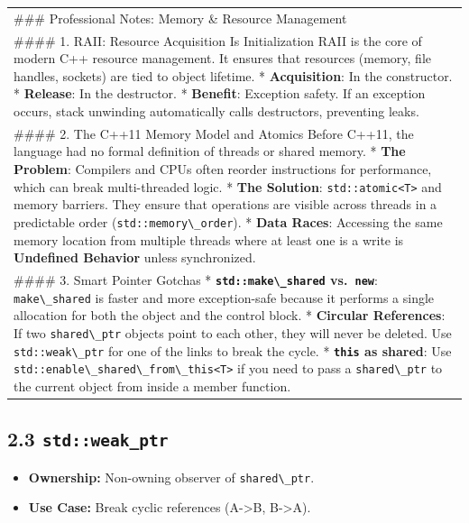 \begin{longtable}[]{@{}
  >{\raggedright\arraybackslash}p{}@{}}
\toprule
\endhead
\#\#\# Professional Notes: Memory \& Resource Management \\
\#\#\#\# 1. RAII: Resource Acquisition Is Initialization RAII is the
core of modern C++ resource management. It ensures that resources
(memory, file handles, sockets) are tied to object lifetime. *
\textbf{Acquisition}: In the constructor. * \textbf{Release}: In the
destructor. * \textbf{Benefit}: Exception safety. If an exception
occurs, stack unwinding automatically calls destructors, preventing
leaks. \\
\#\#\#\# 2. The C++11 Memory Model and Atomics Before C++11, the
language had no formal definition of threads or shared memory. *
\textbf{The Problem}: Compilers and CPUs often reorder instructions for
performance, which can break multi-threaded logic. * \textbf{The
Solution}: \passthrough{\lstinline!std::atomic<T>!} and memory barriers.
They ensure that operations are visible across threads in a predictable
order (\passthrough{\lstinline!std::memory\_order!}). * \textbf{Data
Races}: Accessing the same memory location from multiple threads where
at least one is a write is \textbf{Undefined Behavior} unless
synchronized. \\
\#\#\#\# 3. Smart Pointer Gotchas *
\textbf{\passthrough{\lstinline!std::make\_shared!}
vs.~\passthrough{\lstinline!new!}}:
\passthrough{\lstinline!make\_shared!} is faster and more exception-safe
because it performs a single allocation for both the object and the
control block. * \textbf{Circular References}: If two
\passthrough{\lstinline!shared\_ptr!} objects point to each other, they
will never be deleted. Use \passthrough{\lstinline!std::weak\_ptr!} for
one of the links to break the cycle. *
\textbf{\passthrough{\lstinline!this!} as shared}: Use
\passthrough{\lstinline!std::enable\_shared\_from\_this<T>!} if you need
to pass a \passthrough{\lstinline!shared\_ptr!} to the current object
from inside a member function. \\
\bottomrule
\end{longtable}

\hypertarget{stdweak_ptr}{%
\subsection{\texorpdfstring{2.3
\texttt{std::weak\_ptr}}{2.3 std::weak\_ptr}}\label{stdweak_ptr}}

\begin{itemize}
\tightlist
\item
  \textbf{Ownership:} Non-owning observer of
  \passthrough{\lstinline!shared\_ptr!}.
\item
  \textbf{Use Case:} Break cyclic references (A-\textgreater B,
  B-\textgreater A).
\end{itemize}

